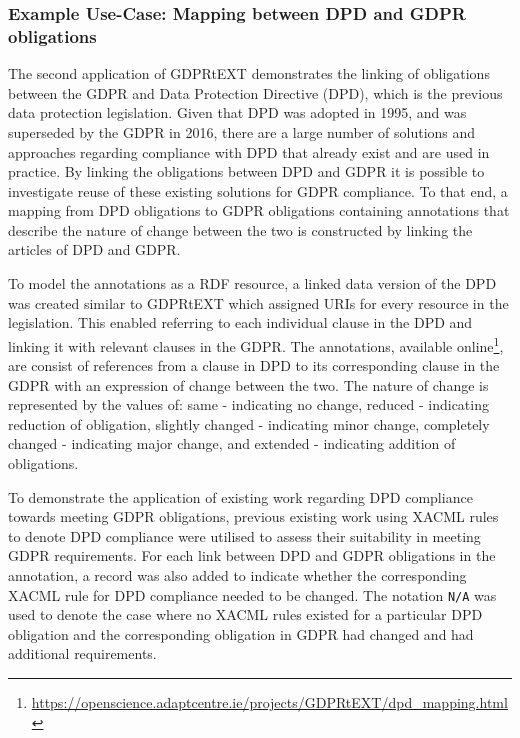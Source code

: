 \subsubsection{Example Use-Case: Mapping between DPD and GDPR obligations}
The second application of GDPRtEXT demonstrates the linking of obligations between the GDPR and Data Protection Directive (DPD), which is the previous data protection legislation. Given that DPD was adopted in 1995, and was superseded by the GDPR in 2016, there are a large number of solutions and approaches regarding compliance with DPD that already exist and are used in practice. By linking the obligations between DPD and GDPR it is possible to investigate reuse of these existing solutions for GDPR compliance. To that end, a mapping from DPD obligations to GDPR obligations containing annotations that describe the nature of change between the two is constructed by linking the articles of DPD and GDPR.

To model the annotations as a RDF resource, a linked data version of the DPD was created similar to GDPRtEXT which assigned URIs for every resource in the legislation. This enabled referring to each individual clause in the DPD and linking it with relevant clauses in the GDPR. 
The annotations, available online\footnote{\url{https://openscience.adaptcentre.ie/projects/GDPRtEXT/dpd_mapping.html}}, are consist of references from a clause in DPD to its corresponding clause in the GDPR with an expression of change between the two. The nature of change is represented by the values of: same - indicating no change, reduced - indicating reduction of obligation, slightly changed - indicating minor change, completely changed - indicating major change, and extended - indicating addition of obligations.

To demonstrate the application of existing work regarding DPD compliance towards meeting GDPR obligations, previous existing work using XACML rules to denote DPD compliance \cite{}\cite{} were utilised to assess their suitability in meeting GDPR requirements.
For each link between DPD and GDPR obligations in the annotation, a record was also added to indicate whether the corresponding XACML rule for DPD compliance needed to be changed. The notation \texttt{N/A} was used to denote the case where no XACML rules existed for a particular DPD obligation and the corresponding obligation in GDPR had changed and had additional requirements. 

